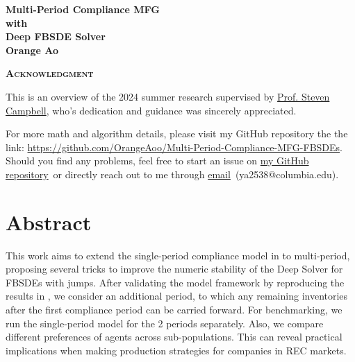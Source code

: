 \documentclass[a4paper,10pt]{article}
\author{Orange Ao}
\title{\vspace{-5ex}}
\date{\vspace{-5ex}}
\makeatletter
\newcommand{\MyGitHub}{\href{https://github.com/OrangeAoo/Multi-Period-Compliance-MFG-FBSDEs}{my GitHub repository}}
\newcommand{\MyEmail}{\href{mailto: ya2538@columbia.edu}{email}}
\newcommand{\1}{\mathbf{1}}
\newcommand{\ProfSC}{\href{https://www.stevenacampbell.com/}{Prof. Steven Campbell}\xspace}
\makeatother
\begin{document}
 
\captionsetup[figure]{hypcap=false}
\pagestyle{fancy}
\fancyhf{}
\fancyfoot[R]{\thepage}
\begin{minipage}{\textwidth}
\vspace{60pt}
\linespread{1.5} 

\begin{center}
\bfseries\Huge\selectfont
Multi-Period Compliance MFG \\
with \\
Deep FBSDE Solver\\
\vspace{30pt}
\normalfont\LARGE
Orange Ao
\vspace{30pt}

\headrule
\vspace{50pt}
\bfseries\LARGE\selectfont
\textsc{Acknowledgment}
\vspace{30pt}
\end{center}

\large
This is an overview of the 2024 summer research supervised by \ProfSC, who's dedication and guidance was sincerely appreciated.
\vspace{10pt}

For more math and algorithm details, please visit my GitHub repository the the link: \hyperlink{https://github.com/OrangeAoo/Multi-Period-Compliance-MFG-FBSDEs}{https://github.com/OrangeAoo/Multi-Period-Compliance-MFG-FBSDEs}. Should you find any problems, feel free to start an issue on \MyGitHub\ or directly reach out to me through \MyEmail\ (ya2538@columbia.edu).

\end{minipage}
\vfill


\newpage  %

\setlength{\parindent}{0pt}

\section*{Abstract}

\normalsize This work aims to extend the single-period compliance model in \cite{SC} to multi-period, proposing several tricks to improve the numeric stability of the Deep Solver for FBSDEs with jumps. After validating the model framework by reproducing the results in \cite{SC}, we consider an additional period, to which any remaining inventories after the first compliance period can be carried forward. For benchmarking, we run the single-period model for the 2 periods separately. Also, we compare different preferences of agents across sub-populations. This can reveal practical implications when making production strategies for companies in REC markets. 
\end{document}
